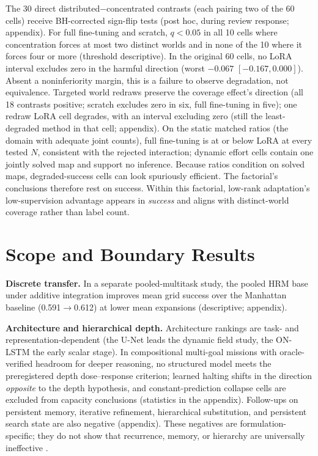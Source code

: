 \documentclass[letterpaper]{article} %
\begin{document}
The 30 direct distributed$-$concentrated contrasts (each pairing two of the 60 cells) receive BH-corrected sign-flip tests (post hoc, during review response; appendix). For full fine-tuning and scratch, $q{<}0.05$ in all 10 cells where concentration forces at most two distinct worlds and in none of the 10 where it forces four or more (threshold descriptive). In the original 60 cells, no LoRA interval excludes zero in the harmful direction (worst $-0.067$ $[-0.167, 0.000]$). Absent a noninferiority margin, this is a failure to observe degradation, not equivalence. Targeted world redraws preserve the coverage effect's direction (all 18 contrasts positive; scratch excludes zero in six, full fine-tuning in five); one redraw LoRA cell degrades, with an interval excluding zero (still the least-degraded method in that cell; appendix). On the static matched ratios (the domain with adequate joint counts), full fine-tuning is at or below LoRA at every tested $N$, consistent with the rejected interaction; dynamic effort cells contain one jointly solved map and support no inference. Because ratios condition on solved maps, degraded-success cells can look spuriously efficient. The factorial's conclusions therefore rest on success. Within this factorial, low-rank adaptation's low-supervision advantage appears in \emph{success} and aligns with distinct-world coverage rather than label count.

\section{Scope and Boundary Results}

\textbf{Discrete transfer.} In a separate pooled-multitask study, the pooled HRM base under additive integration improves mean grid success over the Manhattan baseline (0.591$\to$0.612) at lower mean expansions (descriptive; appendix).

\textbf{Architecture and hierarchical depth.} Architecture rankings are task- and representation-dependent (the U-Net leads the dynamic field study, the ON-LSTM the early scalar stage). In compositional multi-goal missions with oracle-verified headroom for deeper reasoning, no structured model meets the preregistered depth dose--response criterion; learned halting shifts in the direction \emph{opposite} to the depth hypothesis, and constant-prediction collapse cells are excluded from capacity conclusions (statistics in the appendix). Follow-ups on persistent memory, iterative refinement, hierarchical substitution, and persistent search state are also negative (appendix). These negatives are formulation-specific; they do not show that recurrence, memory, or hierarchy are universally ineffective \citep{jolicoeur2025trm,czechowski2021subgoal}.
\end{document}
